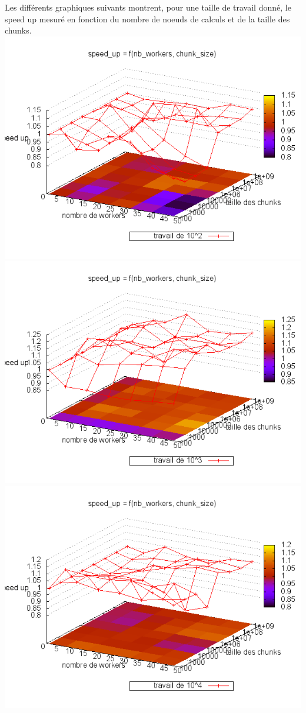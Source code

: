 \documentclass[oneside,10pt]{article}
\begin{document}
Les diff\'erents graphiques suivants montrent, pour une taille de travail donn\'e, le speed up mesur\'e en fonction du nombre de noeuds de calculs et de la taille des chunks.
\\
\includegraphics[scale=0.5]{travail_100.png}
\includegraphics[scale=0.5]{travail_1000.png}
\includegraphics[scale=0.5]{travail_10000.png}
\end{document}
